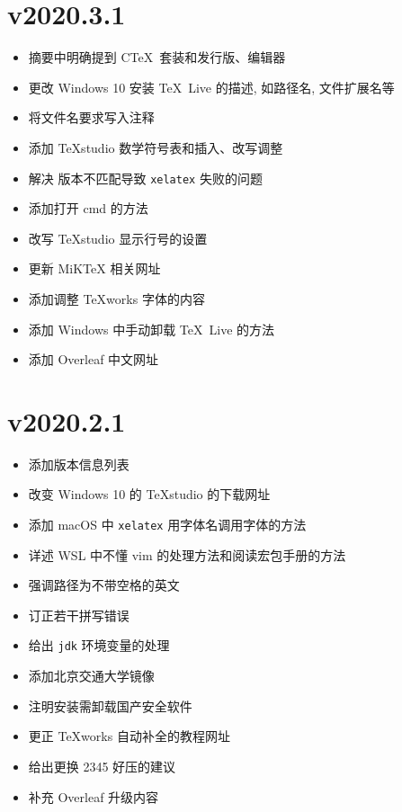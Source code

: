 \section*{v2020.3.1}

\begin{itemize}
    \item 摘要中明确提到 C\TeX\ 套装和发行版、编辑器
    \item 更改 Windows 10 安装 \TeX\ Live 的描述, 如路径名, 文件扩展名等
    \item 将文件名要求写入注释
    \item 添加 \TeX studio 数学符号表和插入、改写调整
    \item 解决 \LaTeXe 版本不匹配导致 \texttt{xelatex} 失败的问题
    \item 添加打开 \textsf{cmd} 的方法
    \item 改写 \TeX studio 显示行号的设置
    \item 更新 MiK\TeX{} 相关网址
    \item 添加调整 \TeX works 字体的内容
    \item 添加 Windows 中手动卸载 \TeX\ Live 的方法
    \item 添加 Overleaf 中文网址
\end{itemize}

\section*{v2020.2.1}

\begin{itemize}
    \item 添加版本信息列表
    \item 改变 Windows 10 的 \TeX studio 的下载网址
    \item 添加 macOS 中 \texttt{xelatex} 用字体名调用字体的方法
    \item 详述 WSL 中不懂 \textsf{vim} 的处理方法和阅读宏包手册的方法
    \item 强调路径为不带空格的英文
    \item 订正若干拼写错误
    \item 给出 \texttt{jdk} 环境变量的处理
    \item 添加北京交通大学镜像
    \item 注明安装需卸载国产安全软件
    \item 更正 \TeX works 自动补全的教程网址
    \item 给出更换 2345 好压的建议
    \item 补充 Overleaf 升级内容
\end{itemize}
